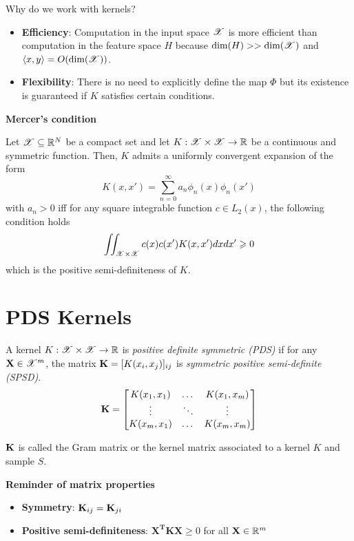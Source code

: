 \documentclass[a4paper,english,12pt]{article}
\begin{document}
\begin{rem} Why do we work with kernels?
\begin{itemize}
	\item \textbf{Efficiency}: Computation in the input space $\mathscr{X}$ is more efficient than computation in the feature space $H$ because $\text{dim}(H) >> \text{dim}(\mathscr{X})$ and $\langle x, y \rangle = O(\text{dim}(\mathscr{X}))$.
	\item \textbf{Flexibility}: There is no need to explicitly define the map $\Phi$ but its existence is guaranteed if $K$ satisfies certain conditions.
\end{itemize}
\end{rem}

\begin{thm}
	\textbf{Mercer's condition}
	
Let $\mathscr{X} \subseteq \mathbb{R}^{N}$ be a compact set and let $K: \mathscr{X} \times \mathscr{X} \to\mathbb{R}$ be a continuous and symmetric function. 
Then, $K$ admits a uniformly convergent expansion of the form
\[K(x,x') = \sum_{n=0}^{\infty} a_n \phi_n(x) \phi_n(x')\]
with $a_n > 0$ iff for any square integrable function $c \in L_2 (x)$, the following condition holds
\[\iint_{\mathscr{X} \times \mathscr{X}} c(x) c(x') K(x, x') dx dx' \geqslant 0\]
which is the positive semi-definiteness of $K$.
\end{thm}

\section{PDS Kernels}

\begin{defn}
	A kernel $K: \mathscr{X} \times \mathscr{X} \to \mathbb{R}$ is \textit{positive definite symmetric (PDS)} if for any $\mathbf{X} \in \mathscr{X}^{m}$, the matrix $\mathbf{K} = [K(x_i, x_j)]_{ij}$ is \textit{symmetric positive semi-definite (SPSD)}.
\[\mathbf{K} =
\begin{bmatrix}
	K(x_1,x_1) 	& \dots 	& K(x_1, x_m) \\
	\vdots		& \ddots 	& \vdots \\
	K(x_m, x_1) & \dots		& K(x_m, x_m)
\end{bmatrix}
\] 

$\mathbf{K}$ is called the Gram matrix or the kernel matrix associated to a kernel $K$ and sample $S$.
\begin{rem}
	\textbf{Reminder of matrix properties}
	\begin{itemize}
		\item \textbf{Symmetry}: $\mathbf{K}_{ij} = \mathbf{K}_{ji}$
		\item \textbf{Positive semi-definiteness}: $\mathbf{X^T K X} \ge 0$ for all $\mathbf{X} \in \mathbb{R}^m$
	\end{itemize}
\end{rem}
\end{defn}
\end{document}
